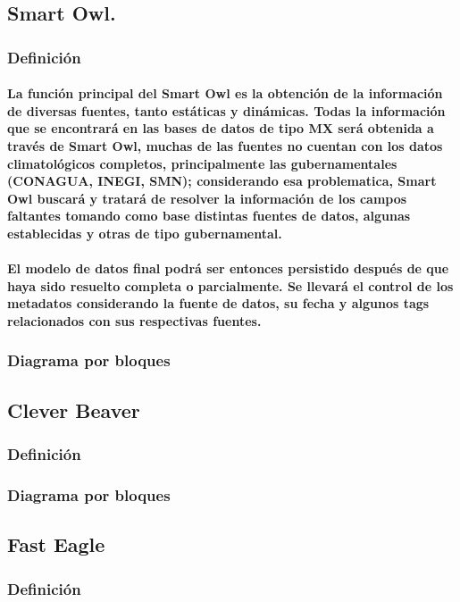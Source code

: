   \subsection{Smart Owl.}
    \subsubsection{Definición}
      \paragraph{La función principal del Smart Owl es la obtención de la información de diversas fuentes, tanto estáticas y dinámicas. Todas la información que se encontrará en las bases de datos de tipo MX será obtenida a través de Smart Owl, muchas de las fuentes no cuentan con los datos climatológicos completos, principalmente las gubernamentales (CONAGUA, INEGI, SMN); considerando esa problematica, Smart Owl buscará y tratará de resolver la información de los campos faltantes tomando como base distintas fuentes de datos, algunas establecidas y otras de tipo gubernamental.}
      \paragraph{El modelo de datos final podrá ser entonces persistido después de que haya sido resuelto completa o parcialmente. Se llevará el control de los metadatos considerando la fuente de datos, su fecha y algunos tags relacionados con sus respectivas fuentes.}
    \subsubsection{Diagrama por bloques}
  \subsection{Clever Beaver}
    \subsubsection{Definición}
    \subsubsection{Diagrama por bloques}
  \subsection{Fast Eagle}
    \subsubsection{Definición}
